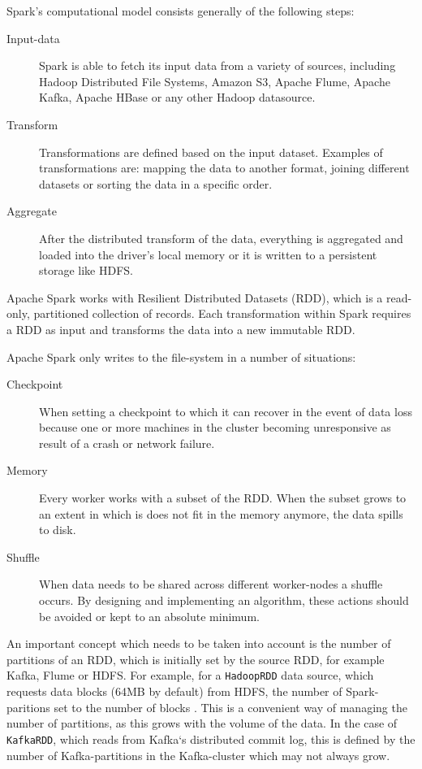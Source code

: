 Spark's computational model consists generally of the following steps:
\begin{description}
  \item[Input-data] Spark is able to fetch its input data from a variety of sources, including Hadoop Distributed File Systems, Amazon S3, Apache Flume, Apache Kafka, Apache HBase or any other Hadoop datasource.
  \item[Transform] Transformations are defined based on the input dataset. Examples of transformations are: mapping the data to another format, joining different datasets or sorting the data in a specific order.
  \item[Aggregate] After the distributed transform of the data, everything is aggregated and loaded into the driver's local memory or it is written to a persistent storage like HDFS.
\end{description}

Apache Spark works with Resilient Distributed Datasets (RDD), which is a read-only, partitioned collection of records. Each transformation within Spark requires a RDD as input and transforms the data into a new immutable RDD. 

Apache Spark only writes to the file-system in a number of situations:
\begin{description}
    \item[Checkpoint] When setting a checkpoint to which it can recover in the event of data loss because one or more machines in the cluster becoming unresponsive as result of a crash or network failure.
    \item[Memory] Every worker works with a subset of the RDD. When the subset grows to an extent in which is does not fit in the memory anymore, the data spills to disk.
    \item[Shuffle] When data needs to be shared across different worker-nodes a shuffle occurs. By designing and implementing an algorithm, these actions should be avoided or kept to an absolute minimum.
\end{description}

An important concept which needs to be taken into account is the number of partitions of an RDD, which is initially set by the source RDD, for example Kafka, Flume or HDFS. For example, for a \texttt{HadoopRDD} data source, which requests data blocks (64MB by default) from HDFS, the number of Spark-paritions set to the number of blocks \cite{Dean:2008:MSD:1327452.1327492}. This is a convenient way of managing the number of partitions, as this grows with the volume of the data. In the case of \texttt{KafkaRDD}, which reads from Kafka`s distributed commit log, this is defined by the number of Kafka-partitions in the Kafka-cluster which may not always grow.

